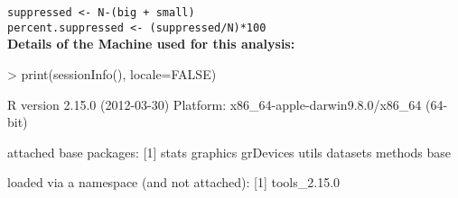 \begin{spacing}{1.5}
\noindent \texttt{suppressed <- N-(big + small)} \\

\noindent \texttt{percent.suppressed <- (suppressed/N)*100} \\

\noindent \textbf{Details of the Machine used for this analysis:}

\begin{Schunk}
\begin{Sinput}
> print(sessionInfo(), locale=FALSE)
\end{Sinput}
\begin{Soutput}
R version 2.15.0 (2012-03-30)
Platform: x86_64-apple-darwin9.8.0/x86_64 (64-bit)

attached base packages:
[1] stats     graphics  grDevices utils     datasets  methods   base     

loaded via a namespace (and not attached):
[1] tools_2.15.0
\end{Soutput}
\end{Schunk}




\end{spacing}

